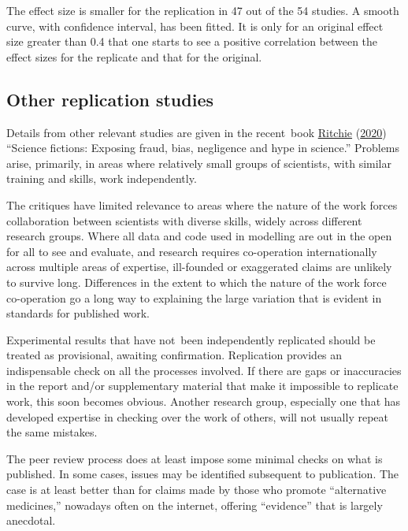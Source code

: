 \documentclass[
  10pt,
  b5paper]{book}
\begin{document}
The effect size is smaller for the replication in 47 out of
the 54 studies. A smooth curve, with confidence interval,
has been fitted. It is only for an original effect size
greater than 0.4 that one starts to see a positive correlation
between the effect sizes for the replicate and that for the
original.

\hypertarget{other-replication-studies}{%
\subsection*{Other replication studies}\label{other-replication-studies}}

Details from other relevant studies are given in the
recent~book \protect\hyperlink{ref-ritchie2020science}{Ritchie} (\protect\hyperlink{ref-ritchie2020science}{2020}) ``Science fictions: Exposing
fraud, bias, negligence and hype in science.''
Problems arise, primarily, in areas where relatively small
groups of scientists, with similar training and skills, work
independently.

The critiques have limited relevance to areas where the nature
of the work forces collaboration between scientists with
diverse skills, widely across different research groups.
Where all data and code used in modelling are out in the open
for all to see and evaluate, and research requires co-operation
internationally across multiple areas of expertise, ill-founded
or exaggerated claims are unlikely to survive long. Differences
in the extent to which the nature of the work force co-operation
go a long way to explaining the large variation that is evident
in standards for published work.

Experimental results that have not~been independently
replicated should be treated as provisional, awaiting
confirmation. Replication provides an indispensable
check on all the processes involved. If there are gaps
or inaccuracies in the report and/or supplementary
material that make it impossible to replicate work,
this soon becomes obvious. Another research group,
especially one that has developed expertise in
checking over the work of others, will not usually
repeat the same mistakes.

The peer review process does at least impose some minimal
checks on what is published. In some cases, issues
may be identified subsequent to publication. The case is
at least better than for claims made by those who promote
``alternative medicines,'' nowadays often on the internet,
offering ``evidence'' that is largely anecdotal.
\end{document}
